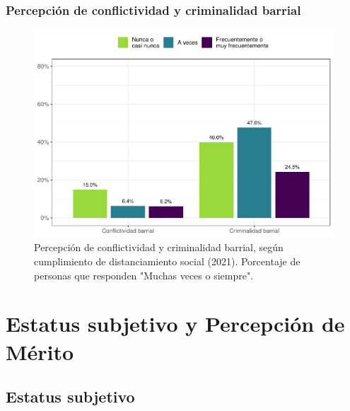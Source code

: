\documentclass[
  12pt,
  openany]{book}
\begin{document}
\hypertarget{percepciuxf3n-de-conflictividad-y-criminalidad-barrial}{%
\subsection{Percepción de conflictividad y criminalidad barrial}\label{percepciuxf3n-de-conflictividad-y-criminalidad-barrial}}

\begin{figure}

{\centering \includegraphics{reporte-elsoc_files/figure-latex/dist-barrio-1} 

}

\caption{Percepción de conflictividad y criminalidad barrial, según cumplimiento de distanciamiento social (2021). Porcentaje de personas que responden "Muchas veces o siempre".}\label{fig:dist-barrio}
\end{figure}

\hypertarget{estatus-subjetivo-y-percepciuxf3n-de-muxe9rito}{%
\chapter{Estatus subjetivo y Percepción de Mérito}\label{estatus-subjetivo-y-percepciuxf3n-de-muxe9rito}}

\hypertarget{estatus-subjetivo}{%
\section{Estatus subjetivo}\label{estatus-subjetivo}}
\end{document}
